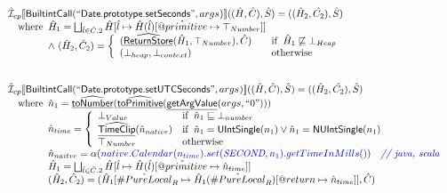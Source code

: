 \documentclass{article}
\makeatletter
\newcommand{\SF}[1]{\mbox{\textsf{#1}}}
\newcommand{\comment}[1]{\textit{#1}}
\newcommand{\wherec}[1]{{\rm where}\begin{array}[t]{l}#1\end{array}}
\newcommand{\ifc}[1]{{\rm if}\begin{array}[t]{l}#1\end{array}}
\newcommand{\owc}{{\rm otherwise}}
\newcommand{\aI}{\hat{\mathcal{I}}}
\newcommand{\lbr}{\llbracket}
\newcommand{\rbr}{\rrbracket}
\newcommand{\hf}[1]{\underline{\sf #1}}
\newcommand{\ahf}[1]{\widehat{\underline{\sf #1}}}
\newcommand{\varprop}[1]{@#1}
\newcommand{\avarloc}[1]{\hat{\##1}}
\newcommand{\avarprop}[1]{\hat{@#1}}
\def\inblue{\color{blue}}
\def\inblue{\color{blue}}
\makeatother
\begin{document}
\[
\begin{array}{l}

\aI _{cp}\lbr \SF{BuiltintCall}(``\SF{Date.prototype.setSeconds}",args_{})\rbr((\hat{H},\hat{C}), \hat{S})
  = ((\hat{H}_2, \hat{C_2}), \hat{S})\\
\quad\wherec{
  \hat{H}_1 = \bigsqcup_{\hat{l} \in \hat{C}.2} \hat{H}[\hat{l}
    \mapsto \hat{H}(\hat{l})[\avarprop{primitive} \mapsto \top_{Number}]]\\
  \land\ (\hat{H}_2, \hat{C}_2) = 
    \left\{\begin{array}{l@{\quad\quad}l}
      (\ahf{ReturnStore}(\hat{H}_1, \top_{Number}), \hat{C})
      & \ifc{\hat{H}_1 \not\sqsubseteq \bot_{Heap}}\\
      (\bot_{heap}, \bot_{context}) & \owc \\
    \end{array}\right.\\
  }\\
\\\\

\aI _{cp}\lbr \SF{BuiltintCall}(``\SF{Date.prototype.setUTCSeconds}",args_{})\rbr((\hat{H},\hat{C}), \hat{S})
  = ((\hat{H}_2, \hat{C_2}), \hat{S})\\
\quad\wherec{
  \hat{n}_{1} = \ahf{toNumber}(\ahf{toPrimitive}(\hf{getArgValue}(args, ``0")))\\
  \hat{n}_{time} = \left\{\begin{array}{ll}
      \bot_{Value} & \ifc{\hat{n}_{1} \sqsubseteq  \bot_{number}}\\
      \ahf{TimeClip}(\hat{n}_{native})
      & \ifc{\hat{n}_{1} = \SF{UIntSingle}(n_{1}) \lor \hat{n}_{1} = \SF{NUIntSingle}(n_{1}) }\\
      \top_{Number} & \owc
    \end{array}\right.\\
  \hat{n}_{naitve} = \alpha({\inblue native.Calendar(n_{time}).set(\emph{SECOND}, n_{1}).getTimeInMills()})
    \quad\comment{{\inblue // java, scala}}\\  
  \hat{H}_1 = \bigsqcup_{\hat{l} \in \hat{C}.2} \hat{H}[\hat{l}
    \mapsto \hat{H}(\hat{l})[\avarprop{primitive} \mapsto \hat{n}_{time}]]\\
  (\hat{H}_2, \hat{C}_2) = 
    (\hat{H}_1[\avarloc{PureLocal}_R \mapsto \hat{H}_1(\avarloc{PureLocal}_R)
      [\varprop{return} \mapsto \hat{n}_{time}]], \hat{C})\\
  }\\
\\\\



\end{array}\]
\end{document}
